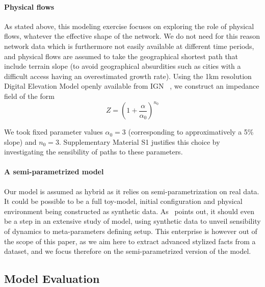 \documentclass[Royal,sageh,times]{sagej}
\begin{document}
\paragraph{Physical flows}

As stated above, this modeling exercise focuses on exploring the role of physical flows, whatever the effective shape of the network. We do not need for this reason network data which is furthermore not easily available at different time periods, and physical flows are assumed to take the geographical shortest path that include terrain slope (to avoid geographical absurdities such as cities with a difficult access having an overestimated growth rate). Using the 1km resolution Digital Elevation Model openly available from IGN~\cite{}%
, we construct an impedance field of the form
\[
Z = \left(1 + \frac{\alpha}{\alpha_0}\right)^{n_0}
\]

We took fixed parameter values $\alpha_0 = 3$ (corresponding to approximatively a 5\% slope) and $n_0 = 3$. Supplementary Material S1 justifies this choice by investigating the sensibility of paths to these parameters.




\paragraph{A semi-parametrized model}

Our model is assumed as hybrid as it relies on semi-parametrization on real data. It could be possible to be a full toy-model, initial configuration and physical environment being constructed as synthetic data. As~\cite{raimbault2016generation} points out, it should even be a step in an extensive study of model, using synthetic data to unveil sensibility of dynamics to meta-parameters defining setup. This enterprise is however out of the scope of this paper, as we aim here to extract advanced stylized facts from a dataset, and we focus therefore on the semi-parametrized version of the model.



\subsection{Model Evaluation}
\end{document}
